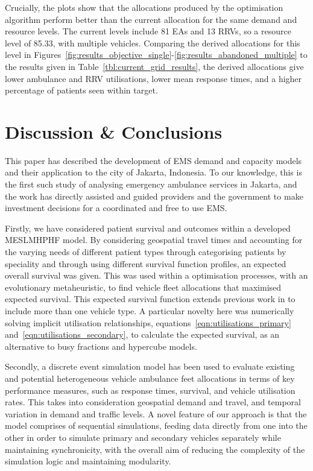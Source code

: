 \documentclass[numbers,webpdf,imaman]{ima-authoring-template}%
\begin{document}
Crucially, the plots show that the allocations produced by the optimisation
algorithm perform better than the current allocation for the same demand and
resource levels. The current levels include 81 EAs and 13 RRVs, so a resource
level of 85.33, with multiple vehicles. Comparing the derived allocations for
this level in
Figures~\ref{fig:results_objective_single}-\ref{fig:results_abandoned_multiple}
to the results given in Table~\ref{tbl:current_grid_results}, the derived
allocations give lower ambulance and RRV utilisations, lower mean response
times, and a higher percentage of patients seen within target.


\section{Discussion \& Conclusions}\label{sec:discussion}
This paper has described the development of EMS demand and capacity models and
their application to the city of Jakarta, Indonesia. To our knowledge, this is
the first such study of analysing emergency ambulance services in Jakarta, and
the work has directly assisted and guided providers and the government to make
investment decisions for a coordinated and free to use EMS.

Firstly, we have considered patient survival and outcomes within a developed
MESLMHPHF model. By considering geospatial travel times and accounting for the
varying needs of different patient types through categorising patients by
speciality and through using different survival function profiles, an expected
overall survival was given. This was used within a optimisation processes, with
an evolutionary metaheuristic, to find vehicle fleet allocations that maximised
expected survival. This expected survival function extends previous work in
\citet{Knight2012918} to include more than one vehicle type. A particular novelty
here was numerically solving implicit utilisation relationships,
equations~\ref{eqn:utilisations_primary} and~\ref{eqn:utilisations_secondary},
to calculate the expected survival, as an alternative to busy fractions and
hypercube models.

Secondly, a discrete event simulation model has been used to evaluate existing
and potential heterogeneous vehicle ambulance feet allocations in terms of key
performance measures, such as response times, survival, and vehicle utilisation
rates. This takes into consideration geospatial demand and travel, and temporal
variation in demand and traffic levels. A novel feature of our approach is that
the model comprises of sequential simulations, feeding data directly from one
into the other in order to simulate primary and secondary vehicles separately
while maintaining synchronicity, with the overall aim of reducing the complexity
of the simulation logic and maintaining modularity.
\end{document}
